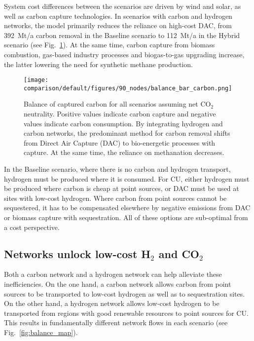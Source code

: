 \documentclass[twocolumn]{article}
\newcommand{\carbon}{CO$_2$}
\newcommand{\hydrogen}{H$_2$}
\newcommand{\baselinescenario}{Baseline scenario}
\newcommand{\hybridscenario}{Hybrid scenario}
\begin{document}
System cost differences between the scenarios are driven by wind and solar, as well as carbon capture technologies. In scenarios with carbon and hydrogen networks, the model primarily reduces the reliance on high-cost DAC, from 392~Mt/a carbon removal in the \baselinescenario{} to 112~Mt/a in the \hybridscenario{} (see Fig.~\ref{fig:balance_captured_carbon}). At the same time, carbon capture from biomass combustion, gas-based industry processes and biogas-to-gas upgrading increase, the latter lowering the need for synthetic methane production.

\begin{figure}[ht!]
    \centering
    \texttt{[image: comparison/default/figures/90\_nodes/balance\_bar\_carbon.png]}
    \caption{Balance of captured carbon for all scenarios assuming net \carbon{} neutrality. Positive values indicate carbon capture and negative values indicate carbon consumption. By integrating hydrogen and carbon networks, the predominant method for carbon removal shifts from Direct Air Capture (DAC) to bio-energetic processes with capture. At the same time, the reliance on methanation decreases.}
    \label{fig:balance_captured_carbon}
\end{figure}

In the \baselinescenario{}, where there is no carbon and hydrogen transport, hydrogen must be produced where it is consumed. For CU, either hydrogen must be produced where carbon is cheap at point sources, or DAC must be used at sites with low-cost hydrogen. Where carbon from point sources cannot be sequestered, it has to be compensated elsewhere by negative emissions from DAC or biomass capture with sequestration. All of these options are sub-optimal from a cost perspective.

\subsection*{Networks unlock low-cost \hydrogen{} and \carbon{}}

Both a carbon network and a hydrogen network can help alleviate these inefficiencies. On the one hand, a carbon network allows carbon from point sources to be transported to low-cost hydrogen as well as to sequestration sites. On the other hand, a hydrogen network allows low-cost hydrogen to be transported from regions with good renewable resources to point sources for CU. This results in fundamentally different network flows in each scenario (see Fig.~\ref{fig:balance_map}).
\end{document}
